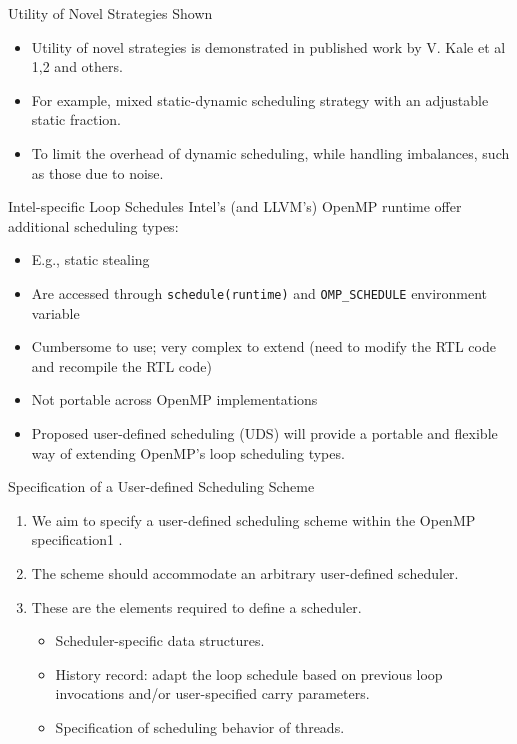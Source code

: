 \begin{frame}{Utility of Novel Strategies Shown} 
\begin{itemize}
\item Utility of novel strategies is demonstrated in published work by V. Kale et al 1,2 and others.
\item For example, mixed static-dynamic scheduling strategy with an adjustable static fraction.
\item To limit the overhead of dynamic scheduling, while handling imbalances, such as those due to noise.
\end{itemize}
\end{frame}

\begin{frame}{Intel-specific Loop Schedules}
Intel’s (and LLVM's) OpenMP runtime offer additional scheduling types:
\begin{itemize}
\small \item \small E.g., static stealing
\item \small Are accessed through \texttt{schedule(runtime)} and \texttt{OMP\_SCHEDULE} environment variable
\item \small Cumbersome to use; very complex to extend (need to modify the RTL code and recompile the RTL code)
\item \small Not portable across OpenMP implementations
\item \small Proposed user-defined scheduling (UDS) will provide a portable and flexible way of extending OpenMP’s loop scheduling types.
\end{itemize}

\end{frame} 


\begin{frame}{ Specification of a User-defined Scheduling Scheme} 

\begin{enumerate}
\item We aim to specify a user-defined scheduling scheme within the OpenMP specification1 .
\item The scheme should accommodate an arbitrary user-defined scheduler.
\item These are the elements required to define a scheduler.
\begin{itemize}
\item Scheduler-specific data structures.
\item History record: adapt the loop schedule based on previous loop invocations and/or user-specified carry parameters. 
\item Specification of scheduling behavior of threads.
\end{itemize}
\end{enumerate} 
\end{frame}



